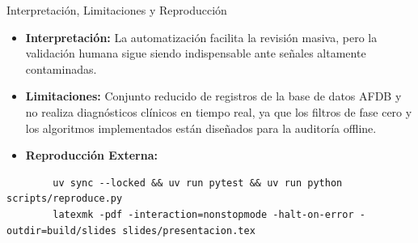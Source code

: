 \documentclass[aspectratio=169]{beamer}
\begin{document}
\begin{frame}[fragile]{Interpretación, Limitaciones y Reproducción}
    \begin{itemize}
        \small
        \item \textbf{Interpretación:} La automatización facilita la revisión masiva, pero la validación humana sigue siendo indispensable ante señales altamente contaminadas.
        \item \textbf{Limitaciones:} Conjunto reducido de registros de la base de datos AFDB y no realiza diagnósticos clínicos en tiempo real, ya que los filtros de fase cero y los algoritmos implementados están diseñados para la auditoría offline.
        \item \textbf{Reproducción Externa:}
    \end{itemize}
    \vspace{-0.1cm}
    \tiny
    \begin{verbatim}
        uv sync --locked && uv run pytest && uv run python scripts/reproduce.py
        latexmk -pdf -interaction=nonstopmode -halt-on-error -outdir=build/slides slides/presentacion.tex
    \end{verbatim}
\end{frame}
\end{document}
